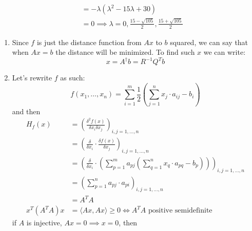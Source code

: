 \documentclass{article}
\begin{document}
\begin{tasks}
\begin{enumerate}
\begin{displaymath}
\begin{aligned}
                    &= -\lambda(\lambda^2 - 15\lambda + 30) \\
                    &= 0 \implies \boxed{\lambda = 0, \frac{15 - \sqrt{105}}{2}, \frac{15 + \sqrt{105}}{2}}
                \end{aligned}
            \end{displaymath}
        \end{enumerate}
        \item \begin{enumerate}
            \item Since \(f\) is just the distance function from \(Ax\) to \(b\) squared, 
                  we can say that when \(Ax = b\) the distance will be minimized. To find
                  such \(x\) we can write:
                  \begin{displaymath}
                    x = A^\dagger b = R^{-1}Q^Tb
                  \end{displaymath}
            \item Let's rewrite \(f\) as such: 
                  \begin{displaymath}
                    f(x_1, \dots, x_n) = \sum_{i=1}^m \frac{1}{2} \left(\sum_{j=1}^n x_j \cdot a_{ij} - b_i\right)
                  \end{displaymath}
                  and then
                  \begin{displaymath}
                    \begin{aligned}
                        H_f(x) 
                        &= \left(\frac{\delta^2f(x)}{\delta x_i\delta x_j} \right)_{i,j = 1,\dots,n} \\
                        &= \left(\frac{\delta}{\delta x_i}\cdot\frac{\delta f(x)}{\delta x_j}\right)_{i,j = 1,\dots,n} \\
                        &= \left(\frac{\delta}{\delta x_i}\cdot\left(\sum_{p=1}^m a_{pj} \left(\sum_{q=1}^n x_q \cdot a_{pq} - b_p\right)\right)\right)_{i,j = 1,\dots,n} \\
                        &= \left(\sum_{p=1}^n a_{pj} \cdot a_{pi}\right)_{i,j = 1,\dots,n} \\
                        &= A^TA \\
                        x^T (A^T A) x &= \langle Ax,Ax\rangle \ge 0 \Longleftrightarrow A^T A \text{ positive semidefinite}
                    \end{aligned}
                  \end{displaymath} 
                  if \(A\) is injective, \(Ax = 0 \implies x = 0\), then 

\end{enumerate}
\end{tasks}
\end{document}
